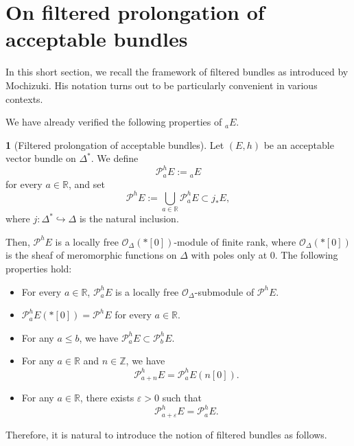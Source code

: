 \documentclass[12pt,twoside]{amsart}
\theoremstyle{definition}
\newtheorem{say}[thm]{}
\begin{document}
\section{On filtered prolongation of acceptable bundles}\label{p-sec8}

In this short section, we recall the framework of filtered 
bundles as introduced by Mochizuki.  
His notation turns out to be particularly convenient in various contexts.

We have already verified the following properties of ${}_a E$.

\begin{say}[Filtered prolongation of acceptable bundles]\label{p-say8.1}
Let $(E, h)$ be an acceptable vector bundle on $\Delta^*$.  
We define
\[
\mathcal{P}^h_a E := {}_a E
\]
for every $a \in \mathbb{R}$, and set
\[
\mathcal{P}^h E := \bigcup_{a \in \mathbb{R}} \mathcal{P}^h_a E \subset j_* E,
\]
where $j \colon \Delta^* \hookrightarrow \Delta$ is the natural inclusion.  

Then, $\mathcal{P}^h E$ is a locally free 
$\mathcal{O}_\Delta(*[0])$-module of finite rank, where 
$\mathcal O_\Delta(\ast [0])$ is the sheaf of 
meromorphic functions on $\Delta$ with poles only at $0$.  
The following properties hold:
\begin{itemize}
  \item[(i)] For every $a \in \mathbb{R}$, $\mathcal{P}^h_a E$ 
  is a locally free $\mathcal{O}_\Delta$-submodule of $\mathcal{P}^h E$.
  
  \item[(ii)] $\mathcal{P}^h_a E(*[0]) = \mathcal{P}^h E$ for every 
  $a\in \mathbb R$.
  
  \item[(iii)] For any $a \leq b$, we have $\mathcal{P}^h_a E \subset \mathcal{P}^h_b E$.
  
  \item[(iv)] For any $a \in \mathbb{R}$ and $n \in \mathbb{Z}$, we have
  \[
  \mathcal{P}^h_{a+n} E = \mathcal{P}^h_a E(n[0]).
  \]
  
  \item[(v)] For any $a \in \mathbb{R}$, 
  there exists $\varepsilon > 0$ such that
  \[
  \mathcal{P}^h_{a+\varepsilon} E = \mathcal{P}^h_a E.
  \]
\end{itemize}
\end{say}

Therefore, it is natural to introduce the notion of filtered bundles as follows.
\end{document}
